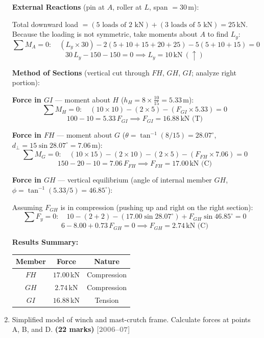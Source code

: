 \documentclass[12pt,a3paper]{article}
\newcommand{\yr}[1]{\hfill\textcolor{gray}{\small\textbf{[#1]}}}
\newcommand{\mk}[1]{\textcolor{orange!70!black}{\small\textbf{(#1 marks)}}}
\begin{document}
\begin{enumerate}
\begin{tcolorbox}[enhanced,breakable,ansbox,colback=cE!4,colframe=cE,
  boxrule=0.8pt,arc=5pt,
  title={\textbf{Solution}},fonttitle=\bfseries\color{white},colbacktitle=cE]
\textbf{External Reactions} (pin at $A$, roller at $L$, span $= 30$\,m):

Total downward load $= (5\text{ loads of } 2\text{ kN}) + (3\text{ loads of } 5\text{ kN}) = 25$\,kN.
Because the loading is not symmetric, take moments about $A$ to find $L_y$:
\[
  \sum M_A = 0\colon\quad
  (L_y\times 30) - 2(5+10+15+20+25) - 5(5+10+15) = 0
\]
\[
  30\,L_y - 150 - 150 = 0
  \implies \boxed{L_y = 10\,\text{kN}\ (\uparrow)}
\]

\medskip
\textbf{Method of Sections} (vertical cut through $FH$, $GH$, $GI$;
analyze right portion):

\medskip
\textbf{Force in $GI$} --- moment about $H$
($h_H = 8\times\frac{10}{15} = 5.33$\,m):
\[
  \sum M_H = 0\colon\quad
  (10\times 10) - (2\times 5) - (F_{GI}\times 5.33) = 0
\]
\[
  100 - 10 = 5.33\,F_{GI}
  \implies \boxed{F_{GI} = 16.88\,\text{kN (T)}}
\]

\medskip
\textbf{Force in $FH$} --- moment about $G$
($\theta = \tan^{-1}(8/15) = 28.07^\circ$,
$d_\perp = 15\sin 28.07^\circ = 7.06$\,m):
\[
  \sum M_G = 0\colon\quad
  (10\times 15) - (2\times 10) - (2\times 5)
  - (F_{FH}\times 7.06) = 0
\]
\[
  150 - 20 - 10 = 7.06\,F_{FH}
  \implies \boxed{F_{FH} = 17.00\,\text{kN (C)}}
\]

\medskip
\textbf{Force in $GH$} --- vertical equilibrium
(angle of internal member $GH$, $\phi = \tan^{-1}(5.33/5) = 46.85^\circ$):

Assuming $F_{GH}$ is in compression (pushing up and right on the right section):
\[
  \sum F_y = 0\colon\quad
  10 - (2+2) - (17.00\sin 28.07^\circ)
  + F_{GH}\sin 46.85^\circ = 0
\]
\[
  6 - 8.00 + 0.73\,F_{GH} = 0
  \implies \boxed{F_{GH} = 2.74\,\text{kN (C)}}
\]

\medskip
\textbf{Results Summary:}
\begin{center}
\begin{tabular}{ccc}
\toprule
\textbf{Member} & \textbf{Force} & \textbf{Nature}\\
\midrule
$FH$ & $17.00$\,kN & Compression\\
$GH$ & $2.74$\,kN  & Compression\\
$GI$ & $16.88$\,kN & Tension\\
\bottomrule
\end{tabular}
\end{center}

\end{tcolorbox}

\item \label{qlabel:B2-Q27}
Simplified model of winch and mast-crutch frame. Calculate forces at points A, B, and D. \mk{22}
\yr{2006--07}



\end{enumerate}
\end{document}
